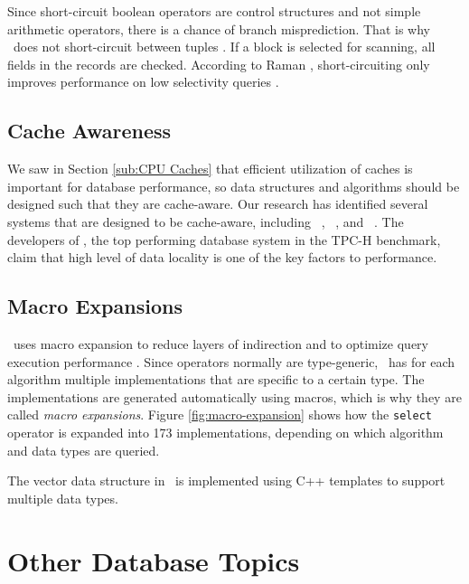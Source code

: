 Since short-circuit boolean operators are control structures and not simple arithmetic operators, there is a chance of branch misprediction. That is why \blink~does not short-circuit between tuples \cite{Raman2008-gi, Johnson2008-cp}. If a block is selected for scanning, all fields in the records are checked. According to Raman \ea, short-circuiting only improves performance on low selectivity queries \cite{Raman2008-gi}.

\subsection{Cache Awareness}
\label{sub:Cache Awareness}
We saw in Section \ref{sub:CPU Caches} that efficient utilization of caches is important for database performance, so data structures and algorithms should be designed such that they are cache-aware. Our research has identified several systems that are designed to be cache-aware, including \monetdb~\cite{Boncz2002-yj}, \mssql~\cite{Lahiri2015-mz}, and \ibm~\cite{Raman2013-em}. The developers of \exasol, the top performing database system in the TPC-H benchmark, claim that high level of data locality is one of the key factors to performance.

\subsection{Macro Expansions}
\label{sub:Macro Expansions}

\monetdb~uses macro expansion to reduce layers of indirection and to optimize query execution performance \cite{Boncz2002-yj}. Since operators normally are type-generic, \monetdb~has for each algorithm multiple implementations that are specific to a certain type. The implementations are generated automatically using macros, which is why they are called \textit{macro expansions}. Figure \ref{fig:macro-expansion} shows how the \texttt{select} operator is expanded into 173 implementations, depending on which algorithm and data types are queried.

The vector data structure in \ibm~is implemented using C++ templates to support multiple data types.



\section{Other Database Topics}
\label{sec:Other Database Topics}

